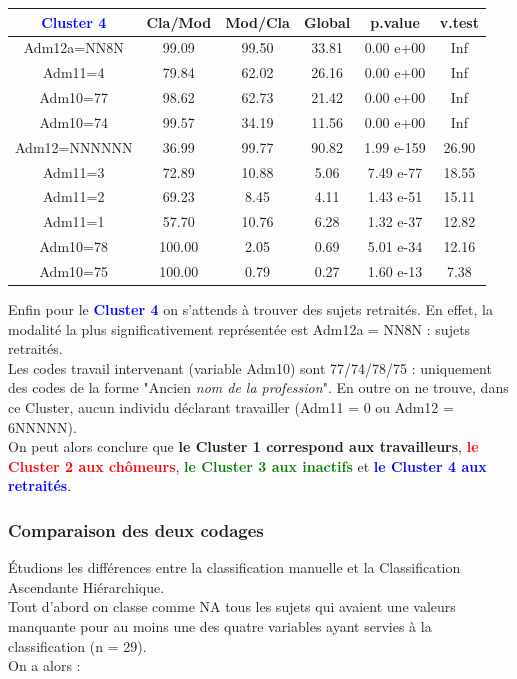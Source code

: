 \documentclass{book}
\begin{document}
\setlength\arrayrulewidth{2pt}
\begin{tabular}{|c||ccccc|}
\hline
   \textbf{\textcolor{blue}{Cluster 4}} &Cla/Mod  &   Mod/Cla      &Global      & p.value  &   v.test\\
   \hline
   \hline
Adm12a=NN8N &  99.09 &99.50 &33.81 & 0.00 e+00  &      Inf\\
Adm11=4      & 79.84 &62.02 &26.16 & 0.00 e+00  &      Inf\\
Adm10=77      &98.62 &62.73 &21.42 & 0.00 e+00  &      Inf\\
Adm10=74      &99.57 &34.19 &11.56 & 0.00 e+00  &      Inf\\
Adm12=NNNNNN  &36.99 &99.77 &90.82 &1.99 e-159  &26.90\\
Adm11=3       &72.89 &10.88 &5.06 & 7.49 e-77  &18.55\\
Adm11=2       &69.23 & 8.45 &4.11 & 1.43 e-51  &15.11\\
Adm11=1       &57.70 &10.76 &6.28 & 1.32 e-37  &12.82\\
Adm10=78     &100.00 & 2.05 &0.69 & 5.01 e-34  &12.16\\
Adm10=75     &100.00 & 0.79 &0.27  &1.60 e-13 &  7.38\\
\hline
\end{tabular}

\noindent
Enfin pour le \textbf{\textcolor{blue}{Cluster 4}} on s'attends à trouver des sujets retraités. En effet, la modalité la plus significativement représentée est Adm12a = NN8N : sujets retraités. \\
Les codes travail intervenant (variable Adm10) sont 77/74/78/75 : uniquement des codes de la forme "Ancien \textit{nom de la profession}".
En outre on ne trouve, dans ce Cluster, aucun individu déclarant travailler (Adm11 = 0 ou Adm12 = 6NNNNN).\\

\noindent
On peut alors conclure que  \textbf{le Cluster 1 correspond aux travailleurs}, \textbf{\textcolor{red}{le Cluster 2 aux chômeurs}}, \textbf{\textcolor{green}{le Cluster 3 aux inactifs}} et \textbf{\textcolor{blue}{le Cluster 4 aux retraités}}.\\

\subsubsection{Comparaison des deux codages}
\noindent
Étudions les différences entre la classification manuelle et la Classification Ascendante Hiérarchique.\\
Tout d'abord on classe comme NA tous les sujets qui avaient une valeurs manquante pour au moins une des quatre variables ayant servies à la classification (n = 29).\\
On a alors : \\
\end{document}
